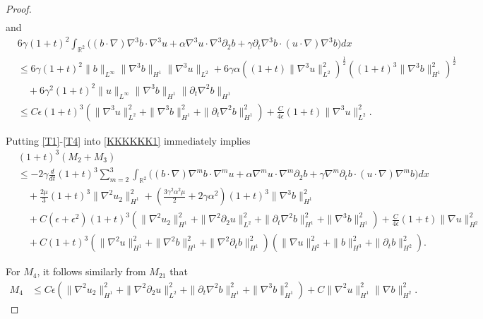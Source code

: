 \documentclass[reqno,11pt]{amsart}
\def\R{\mathbb R}
\numberwithin{Thm}{section}
\begin{document}
\begin{proof}
\begin{align}
\end{align}
and
\begin{align}\label{T4}
&6\gamma(1+t)^2\int_{\R^2}\big((b\cdot\nabla)\nabla^3 b\cdot\nabla^3 u+\alpha\nabla^3 u\cdot\nabla^3\partial_2 b+\gamma\partial_{t}\nabla^3 b\cdot (u\cdot\nabla)\nabla^3 b\big)dx\nonumber\\
&\leq6\gamma(1+t)^2\|b\|_{L^\infty}\|\nabla^3 b\|_{H^1}\|\nabla^3 u\|_{L^2} +6\gamma\alpha\left((1+t)\|\nabla^3 u\|_{L^2}^2\right)^{\frac{1}{2}}\left((1+t)^3\|\nabla^3 b\|_{H^1}^2\right)^{\frac{1}{2}}\nonumber\\
&\quad+6\gamma^2(1+t)^2\|u\|_{L^\infty}\|\nabla^3 b\|_{H^1}\|\partial_t\nabla^2 b\|_{H^1} \nonumber\\
&\leq C\epsilon(1+t)^3(\|\nabla^3 u\|_{L^2}^2+\|\nabla^3 b\|_{H^1}^2+\|\partial_t\nabla^2 b\|_{H^1}^2) +\frac{C}{4\epsilon}(1+t)\|\nabla^3u\|_{L^2}^2.
\end{align}



Putting \eqref{T1}-\eqref{T4} into \eqref{KKKKKK1} immediately implies
\begin{align*}
&(1+t)^3(M_{2}+M_{3})\nonumber\\&\leq
-2\gamma\frac{d}{dt}(1+t)^3\sum_{m=2}^3\int_{\mathbb{R}^2}
		\big((b\cdot\nabla)\nabla^m b\cdot\nabla^m u
		+\alpha\nabla^m u\cdot\nabla^m\partial_2 b
		+\gamma\nabla^m\partial_t b\cdot (u\cdot\nabla)\nabla^m b\big)dx\nonumber\\
&\quad+\frac{2\mu}{3}(1+t)^3\| \nabla^2 u_2\|_{H^1}^2+(\frac{3\gamma^2\alpha^2\mu}{2}+2\gamma\alpha^2)(1+t)^3\|\nabla^3 b\|_{H^1}^2\nonumber\\
&\quad+C\left(\epsilon+\epsilon^2\right)(1+t)^3\left(\|\nabla^2 u_2\|_{H^{1}}^2+\|\nabla^2\partial_2 u\|_{L^{2}}^2+\|\partial_t\nabla^2 b\|_{H^1}^2+\|\nabla^3 b\|_{H^1}^2\right)+\frac{C}{4\epsilon}(1+t)\|\nabla u\|_{H^2}^2\nonumber\\&\quad+C(1+t)^3(\|\nabla^2u\|_{H^1}^2+\|\nabla^2 b\|_{H^1}^2+\|\nabla^2\partial_t b\|_{H^1}^2)\left(\|\nabla u\|_{H^2}^2+\|b\|_{H^3}^2+\|\partial_tb\|_{H^2}^2\right).
\end{align*}


For $M_{4}$, it follows similarly from $M_{21}$ that
\begin{align*}
M_{4}&\leq
C\epsilon(\|\nabla^2 u_2\|_{H^{1}}^2+\|\nabla^2\partial_2 u\|_{L^{2}}^2+\|\partial_t\nabla^2 b\|_{H^1}^2+\|\nabla^3 b\|_{H^1}^2)+C\|\nabla^2 u\|_{H^{1}}^2\|\nabla b\|_{H^{2}}^2.
\end{align*}





\end{proof}
\end{document}
